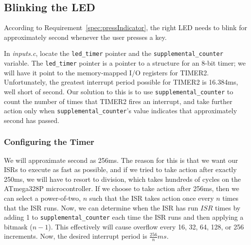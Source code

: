\subsection{Blinking the LED} \label{subsec:blinking}

According to Requirement~\ref{spec:pressIndicator}, the right LED needs to blink for approximately \textonequarter second whenever the user presses a key.

In \textit{inputs.c}, locate the \lstinline{led_timer} pointer and the \lstinline{supplemental_counter} variable.
The \lstinline{led_timer} pointer is a pointer to a structure for an 8-bit timer;
we will have it point to the memory-mapped I/O registers for TIMER2.
Unfortunately, the greatest interrupt period possible for TIMER2 is 16.384ms, well short of \textonequarter second.
Our solution to this is to use \lstinline{supplemental_counter} to count the number of times that TIMER2 fires an interrupt,
and take further action only when \lstinline{supplemental_counter}'s value indicates that approximately \textonequarter second has passed.

\subsubsection{Configuring the Timer}

We will approximate \textonequarter second as 256ms.
The reason for this is that we want our ISRs to execute as fast as possible, and if we tried to take action after exactly 250ms, we will have to resort to division, which takes hundreds of cycles on the ATmega328P microcontroller.
If we choose to take action after 256ms, then we can select a power-of-two, $n$ such that the ISR takes action once every $n$ times that the ISR runs.
Now, we can determine when the ISR has run $ISR$ times by adding 1 to \lstinline{supplemental_counter} each time the ISR runs and then applying a bitmask ($n-1$).
This effectively will cause overflow every 16, 32, 64, 128, or 256 increments.
Now, the desired interrupt period is $\frac{256}{n}ms$.

